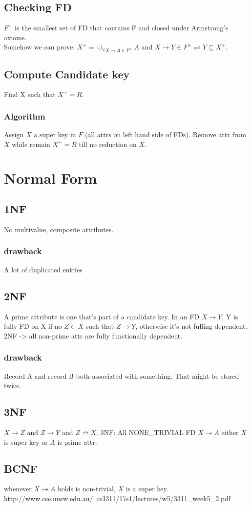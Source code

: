 \documentclass[a4paper]{scrartcl}
\begin{document}
  \subsection{Checking FD}
    $F^+$ is the smallest set of FD that contains F and closed under Armstrong's axioms.\\
    Somehow we can prove: $X^+ = \cup_{\forall X \rightarrow A \in F^+}A$ and $X\rightarrow Y \in F^+ \rightleftharpoons Y \subseteq X^+$.
  \subsection{Compute Candidate key}
    Find X such that $X^+ = R$.
    \subsubsection{Algorithm}
      Assign $X$ a super key in $F$ (all attrs on left hand side of FDs). Remove attr from $X$ while remain $X^+ = R$ till no reduction on $X$.
\section{Normal Form}
  \subsection{1NF}
    No multivalue, composite attributes.
    \subsubsection{drawback}
      A lot of duplicated entries
  \subsection{2NF}
    A prime attribute is one that's part of a candidate key. In an FD $X\rightarrow Y$, Y is fully FD on X if no $Z \subset X$ such that $Z \rightarrow Y$, otherwise it's not fulling dependent. 2NF -> all non-prime attr are fully functionally dependent. 
    \subsubsection{drawback}
      Record A and record B both associated with something. That might be stored twice.
  \subsection{3NF}
    $X \rightarrow Z$ and $Z \rightarrow Y$ and $Z \nrightarrow X$. 3NF: All NONE\_TRIVIAL FD $X \rightarrow A$ either $X$ is super key or $A$ is prime attr.
  \subsection{BCNF}
    whenever $X \rightarrow A$ holds is non-trivial, $X$ is a super key.
    http://www.cse.unsw.edu.au/~cs3311/17s1/lectures/w5/3311_week5_2.pdf
\end{document}
